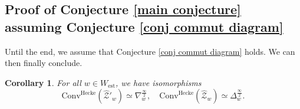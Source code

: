 \documentclass[11pt]{amsart}
\theoremstyle{plain}
\newtheorem{coro}[thm]{Corollary}
\theoremstyle{remark}
\numberwithin{equation}{section}
\begin{document}
\subsection{Proof of Conjecture \ref{main conjecture} assuming Conjecture \ref{conj commut diagram}}\label{section proof of conjecture} Until the end, we assume that  Conjecture \ref{conj commut diagram} holds.  We can then finally conclude.
\begin{coro}
    For all $w\in W_\mathrm{est}$, we have isomorphisms
\begin{equation*}
    \mathrm{Conv}^{\mathrm{Hecke}}(\widehat{\mathcal{Z}}'_w)\simeq \nabla^{\frac{\infty}{2}}_{w},\quad \mathrm{Conv}^{\mathrm{Hecke}}(\widehat{\mathcal{Z}}_w)\simeq \Delta^{\frac{\infty}{2}}_{w}.
\end{equation*}
\end{coro}
\end{document}
